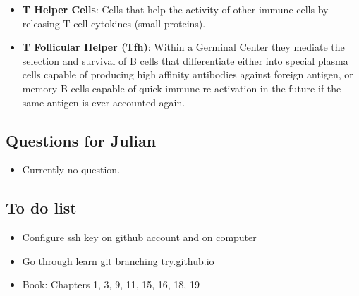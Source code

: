 \documentclass[english]{article}
\begin{document}
\begin{itemize}
\item \textbf{T Helper Cells}: Cells that help the activity of other immune cells by releasing T cell cytokines (small proteins).

\item \textbf{T Follicular Helper (Tfh)}: Within a Germinal Center they mediate the selection and survival of B cells that differentiate either into special plasma cells capable of producing high affinity antibodies against foreign antigen, or memory B cells capable of quick immune re-activation in the future if the same antigen is ever accounted again. 


\end{itemize}

\subsection{Questions for Julian}
\begin{itemize}

\item Currently no question. 


\end{itemize}

\subsection{To do list}

\begin{itemize}

\item Configure ssh key on github account and on computer

\item Go through learn git branching try.github.io

\item Book: Chapters 1, 3, 9, 11, 15, 16, 18, 19 

\end{itemize}
\end{document}
